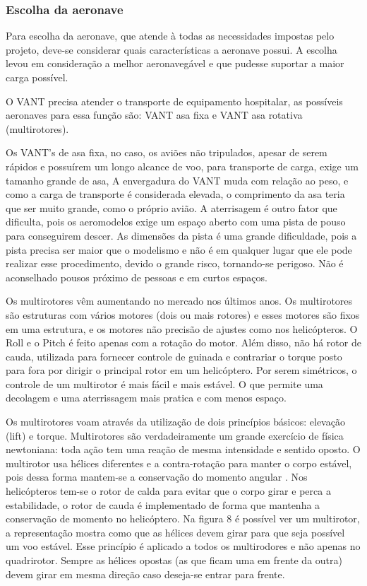\subsubsection{Escolha da aeronave}

Para escolha da aeronave, que atende à todas as necessidades impostas pelo projeto, deve-se considerar quais características a aeronave possui. A escolha levou em consideração a melhor aeronavegável e que pudesse suportar a maior carga possível.

O VANT precisa atender o transporte de equipamento hospitalar, as possíveis aeronaves para essa função são: VANT asa fixa e VANT asa rotativa (multirotores).

Os VANT’s de asa fixa, no caso, os aviões não tripulados, apesar de serem rápidos e possuírem um longo alcance de voo, para transporte de carga, exige um tamanho grande de asa, A envergadura do VANT muda com relação ao peso, e como a carga de transporte é considerada elevada, o comprimento da asa teria que ser muito grande, como o próprio avião. A aterrisagem é outro fator que dificulta, pois os aeromodelos exige um espaço aberto com uma pista de pouso para conseguirem descer. As dimensões da pista é uma grande dificuldade, pois a pista precisa ser maior que o modelismo e não é em qualquer lugar que ele pode realizar esse procedimento, devido o grande risco, tornando-se perigoso. Não é aconselhado pousos próximo de pessoas e em curtos espaços.

Os multirotores vêm aumentando no mercado nos últimos anos. Os multirotores são estruturas com vários motores (dois ou mais rotores) e esses motores são fixos em uma estrutura, e os motores não precisão de ajustes como nos helicópteros. O Roll e o Pitch é feito apenas com a rotação do motor. Além disso, não há rotor de cauda, utilizada para fornecer controle de guinada e contrariar o torque posto para fora por dirigir o principal rotor em um helicóptero. Por serem simétricos, o controle de um multirotor é mais fácil e mais estável. O que permite uma decolagem e uma aterrissagem mais pratica e com menos espaço.

Os multirotores voam através da utilização de dois princípios básicos: elevação (lift) e torque. Multirotores são verdadeiramente um grande exercício de física newtoniana: toda ação tem uma reação de mesma intensidade e sentido oposto. O multirotor usa  hélices diferentes e a contra-rotação para  manter o corpo  estável, pois dessa forma mantem-se a conservação do momento angular \cite{audronis}. Nos helicópteros tem-se o rotor de calda para evitar que o corpo girar e perca a estabilidade, o rotor de cauda é implementado de forma que mantenha a conservação de momento no helicóptero. 
Na figura 8 é possível ver um multirotor, a representação mostra como que as hélices devem girar para que seja possível um voo estável. Esse princípio é aplicado a todos os multirodores e não apenas no quadrirotor. Sempre as hélices opostas (as que ficam uma em frente da outra) devem girar em mesma direção caso deseja-se entrar para frente.


